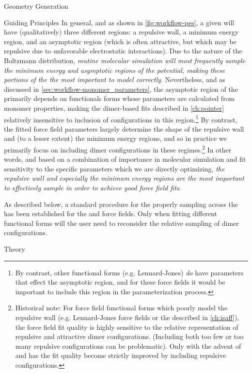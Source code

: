 \begin{section}{Geometry Generation}
\begin{subsection}{Guiding Principles}
In general, and as shown in \cref{fig:workflow-pes}, a given \pes will have (qualitatively) three different regions: a
repulsive wall, a minimum energy region, and an asymptotic region (which is
often attractive, but which may be repulsive due to unfavorable
electrostatic interactions). Due to the nature of the Boltzmann distribution, \emph{routine molecular simulation will most frequently
sample the minimum energy and asymptotic regions of the potential, making
these portions of the \pes the most important to model correctly}.
Nevertheless, and as discussed in \cref{sec:workflow-monomer_parameters}, the
asymptotic region of the \pes primarily depends on functionals forms whose
parameters are calculated from monomer properties, making 
the dimer-based fits described in \cref{ch:pointer} relatively insensitive to
inclusion of configurations in this %
region.\footnote{By contrast, other functional forms (e.g. Lennard-Jones) \emph{do}
have parameters that effect the asymptotic region, and for these force fields
it would be important to include this region in the parameterization process.}
%
By contrast, the fitted force field parameters largely determine the shape of
the repulsive wall and (to a lesser extent) the minimum energy regions, and so in practice we primarily
focus on including dimer configurations in these %
%
regimes.\footnote{Historical note: For force field functional forms which
poorly model the repulsive wall (e.g. Lennard-Jones force fields or the \saptff
described in \cref{ch:isaff}), 
the force field fit quality is highly sensitive to the
relative representation of repulsive and attractive dimer configurations.
(Including both too few or too many repulsive configurations can be
problematic). Only with the advent of \isaffold and \mastiff has the
fit quality become strictly improved by including repulsive configurations.}
%
In other words, and based on a combination of importance in molecular
simulation and fit sensitivity to the specific parameters which we are directly
optimizing, \emph{the repulsive wall and especially the minimum energy regions are the
most important to effectively sample in order to achieve good force field fits}.

As described below, a standard procedure for the properly sampling across the
\pes has been established for the \isaffold
and \mastiff force fields. Only when fitting different functional forms will
the user need to reconsider the relative sampling of dimer configurations.

\end{subsection}
\begin{subsection}{Theory}


\end{subsection}
\end{section}
